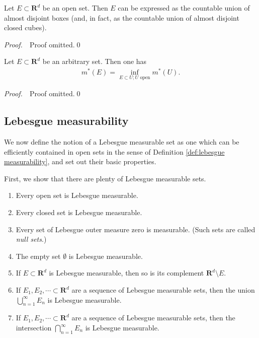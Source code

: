 \documentclass{book}
\theoremstyle{defstyle}
\theoremstyle{thmstyle}
\newcommand{\pff}{\noindent\emph{Proof.}~~}
\begin{document}
\begin{lemma}\label{thm:open set can be expressed as countable union of almost disjoint boxes}
    Let $E \subset \mathbf{R}^d$ be an open set. Then $E$ can be expressed as the countable union of almost disjoint boxes (and, in fact, as the countable union of almost disjoint closed cubes).
\end{lemma}

\pff Proof omitted.\qed

\begin{lemma}\label{thm:outer regularity}
    Let $E \subset \mathbf{R}^d$ be an arbitrary set. Then one has
        \begin{align}
            m^*(E) = \inf_{E \subset U; U \text{ open}}m^*(U).
        \end{align}
\end{lemma}

\pff Proof omitted.\qed



\subsection{Lebesgue measurability}

We now define the notion of a Lebesgue measurable set as one which can be efficiently contained in open sets in the sense of Definition \ref{def:lebesgue measurability}, and set out their basic properties.

First, we show that there are plenty of Lebesgue measurable sets.

\begin{lemma}\label{thm:existence of lebesgue measurable sets}
    \qquad
    \begin{enumerate}
        \item Every open set is Lebesgue measurable.
        \item Every closed set is Lebesgue measurable.
        \item Every set of Lebesgue outer measure zero is measurable. (Such sets are called \emph{null sets}.)
        \item The empty set $\emptyset$ is Lebesgue measurable.
        \item If $E \subset \mathbf{R}^d$ is Lebesgue measurable, then so is its complement $\mathbf{R}^d \setminus E$.
        \item If $E_1, E_2, \cdots \subset \mathbf{R}^d$ are a sequence of Lebesgue measurable sets, then the union $\bigcup_{n = 1}^{\infty}E_n$ is Lebesgue measurable.
        \item If $E_1, E_2, \cdots \subset \mathbf{R}^d$ are a sequence of Lebesgue measurable sets, then the intersection $\bigcap_{n = 1}^{\infty}E_n$ is Lebesgue measurable.
    \end{enumerate}
\end{lemma}
\end{document}
